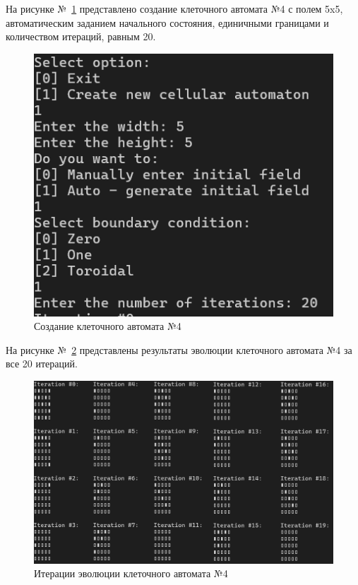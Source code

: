 \documentclass[a4paper, final]{article}
\begin{document}
На рисунке №~\ref{img:example4} представлено создание клеточного автомата №4 с полем 5x5, автоматическим заданием 
начального состояния, единичными границами и количеством итераций, равным 20.
\begin{figure}[H]
   \centering
   \includegraphics[scale=0.6]{example4.png}
   \caption{Создание клеточного автомата №4}
   \label{img:example4}
\end{figure}

На рисунке №~\ref{img:example4_res} представлены результаты эволюции клеточного автомата №4 за все 20 итераций.

\begin{figure}[H]
  \centering
  \includegraphics[scale=0.6]{example4_res.png}
  \caption{Итерации эволюции клеточного автомата №4}
  \label{img:example4_res}
\end{figure}
\end{document}
